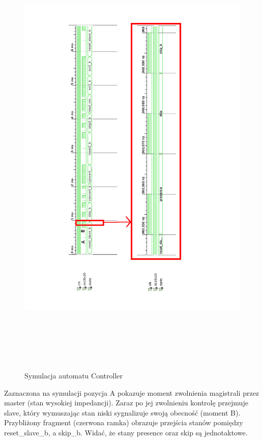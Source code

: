 \documentclass[a4paper]{article}
\begin{document}
\newpage

\begin{figure}[H]
\begin{center}
\includegraphics[height=22cm]{graphics/controller_symulation.png}
\end{center}
\caption{Symulacja automatu Controller}
\label{controller_symulation}
\end{figure}

Zaznaczona na symulacji pozycja A pokazuje moment zwolnienia magistrali przez master (stan wysokiej impedancji). Zaraz po jej zwolnieniu kontrolę przejmuje slave, który wymuszając stan niski sygnalizuje swoją obecność (moment B). Przybliżony fragment (czerwona ramka) obrazuje przejścia stanów pomiędzy reset\_slave\_b, a skip\_b. Widać, że stany presence oraz skip są jednotaktowe. 
\end{document}
